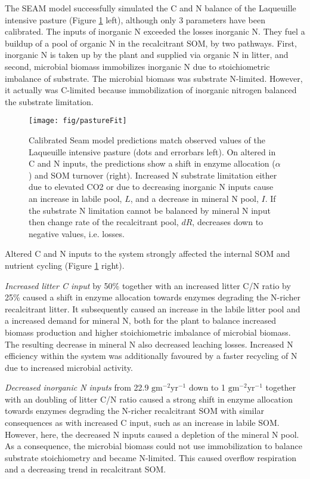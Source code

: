 The SEAM model successfully simulated the C and N balance of the Laqueuille
intensive pasture (Figure \ref{fig:pastureFit} left), although only 3 parameters
have been calibrated.
The inputs of inorganic N exceeded the losses inorganic N. They fuel a buildup
of a pool of organic N in the recalcitrant SOM, by two pathways. First,
inorganic N is taken up by the plant and supplied via organic N in litter, and
second, microbial biomass immobilizes inorganic N due to stoichiometric
imbalance of substrate. The microbial biomass was substrate N-limited. However,
it actually was C-limited because immobilization of inorganic nitrogen balanced
the substrate limitation. 

\begin{figure}[t] \vspace*{2mm}
\label{fig:pastureFit}
\begin{center}
\texttt{[image: fig/pastureFit]} 
\end{center}
\caption{Calibrated Seam model predictions match observed values of the
Laqueuille intensive pasture (dots and errorbars left). On altered in C and N
inputs, the predictions show a shift in enzyme allocation ($\alpha$) and SOM
turnover (right).
Increased N substrate limitation either due to elevated CO2 or due to
decreasing inorganic N inputs cause an increase in labile pool, $L$, and a
decrease in mineral N pool, $I$. If the substrate N limitation cannot be balanced by mineral N
input then change rate of the recalcitrant pool, $dR$, decreases down to
negative values, i.e. losses.
}
\end{figure}   

Altered C and N inputs to the system strongly affected the internal SOM and
nutrient cycling (Figure \ref{fig:pastureFit} right). 

\textit{Increased litter C input} by 50\% together with an increased litter
C/N ratio by 25\% caused a shift in enzyme allocation towards enzymes degrading the
N-richer recalcitrant litter. It subsequently caused an increase in the
labile litter pool and a increased demand for mineral N, both for 
the plant to balance increased biomass production and higher stoichiometric
imbalance of microbial biomass. The resulting decrease in mineral N also
decreased leaching losses. Increased N efficiency within the system was
additionally favoured by a faster recycling of N due to increased
microbial activity.

\textit{Decreased inorganic N inputs} from 22.9
${\textrm{gm}^{-2}\textrm{yr}^{-1}}$ down to 1
${\textrm{gm}^{-2}\textrm{yr}^{-1}}$ together with an doubling of litter C/N
ratio caused a strong shift in enzyme allocation towards enzymes degrading the
N-richer recalcitrant SOM with similar consequences as with increased C input,
such as an increase in labile SOM. However, here, the decreased N inputs caused
a depletion of the mineral N pool.
As a consequence, the microbial biomass could not use immobilization to
balance substrate stoichiometry and became N-limited.
This caused overflow respiration and a decreasing trend in recalcitrant SOM.


